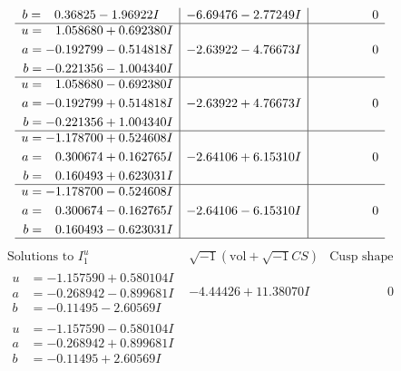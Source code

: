 \documentclass[1p]{elsarticle_modified}
\theoremstyle{definition}
\newcommand{\I}{\sqrt{-1}}
\begin{document}
$$\begin{array}{c|c|c}
\begin{aligned}
b &= \phantom{-}0.36825 - 1.96922 I\end{aligned}
 & -6.69476 - 2.77249 I & \phantom{-0.000000 } 0 \\ \hline\begin{aligned}
u &= \phantom{-}1.058680 + 0.692380 I \\
a &= -0.192799 - 0.514818 I \\
b &= -0.221356 - 1.004340 I\end{aligned}
 & -2.63922 - 4.76673 I & \phantom{-0.000000 } 0 \\ \hline\begin{aligned}
u &= \phantom{-}1.058680 - 0.692380 I \\
a &= -0.192799 + 0.514818 I \\
b &= -0.221356 + 1.004340 I\end{aligned}
 & -2.63922 + 4.76673 I & \phantom{-0.000000 } 0 \\ \hline\begin{aligned}
u &= -1.178700 + 0.524608 I \\
a &= \phantom{-}0.300674 + 0.162765 I \\
b &= \phantom{-}0.160493 + 0.623031 I\end{aligned}
 & -2.64106 + 6.15310 I & \phantom{-0.000000 } 0 \\ \hline\begin{aligned}
u &= -1.178700 - 0.524608 I \\
a &= \phantom{-}0.300674 - 0.162765 I \\
b &= \phantom{-}0.160493 - 0.623031 I\end{aligned}
 & -2.64106 - 6.15310 I & \phantom{-0.000000 } 0\\
 \hline 
 \end{array}$$\newpage$$\begin{array}{c|c|c}  
\text{Solutions to }I^u_{1}& \I (\text{vol} + \sqrt{-1}CS) & \text{Cusp shape}\\
 \hline 
\begin{aligned}
u &= -1.157590 + 0.580104 I \\
a &= -0.268942 - 0.899681 I \\
b &= -0.11495 - 2.60569 I\end{aligned}
 & -4.44426 + 11.38070 I & \phantom{-0.000000 } 0 \\ \hline\begin{aligned}
u &= -1.157590 - 0.580104 I \\
a &= -0.268942 + 0.899681 I \\
b &= -0.11495 + 2.60569 I\end{aligned}

\end{array}$$
\end{document}

